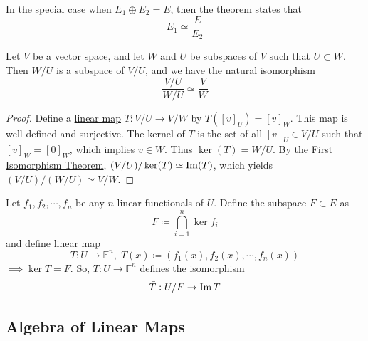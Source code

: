   \begin{corollary}
    \label{thm:rank-nullity-for-a-direct-sum}
    In the special case when $E_1 \oplus E_2 = E$, then the theorem states that 
    \begin{equation}
      E_1 \simeq \frac{E}{E_2}
    \end{equation}
  \end{corollary}

  \begin{theorem}
    \label{thm:third-isomorphism-theorem}
    Let $V$ be a \hyperref[def:vector-space]{vector space}, and let $W$ and $U$ be subspaces of $V$ such that $U \subset W$. Then $W/U$ is a subspace of $V/U$, and we have the \hyperref[cat-def:natural-isomorphism]{natural isomorphism}
    \begin{equation}
      \frac{V / U}{W / U} \simeq \frac{V}{W}
    \end{equation}
  \end{theorem}
  \begin{proof}
    Define a \hyperref[def:linear_map]{linear map} $T: V/U \to V/W$ by $T([v]_U) = [v]_W$. This map is well-defined and surjective. The kernel of $T$ is the set of all $[v]_U \in V/U$ such that $[v]_W = [0]_W$, which implies $v \in W$. Thus $\ker(T) = W/U$. By the \hyperref[thm:first-isomorphism-theorem]{First Isomorphism Theorem}, $(V/U) / \ker(T) \simeq \operatorname{Im}(T)$, which yields $(V/U)/(W/U) \simeq V/W$.
  \end{proof}

  Let $f_1, f_2, \cdots, f_n$ be any $n$ linear functionals of $U$. Define the subspace $F \subset E$ as 
  \begin{equation}
    F \coloneqq \bigcap_{i=1}^n \ker{f_i}
  \end{equation}
  and define \hyperref[def:linear_map]{linear map} 
  \begin{equation}
    T: U \to \mathbb{F}^n, \; T(x) \coloneqq (f_1(x), f_2(x), \cdots, f_n(x))
  \end{equation}
  $\implies \ker{T} = F$. So, $T: U \to \mathbb{F}^n$ defines the isomorphism 
  \begin{equation}
    \bar{T}: U / F \to \operatorname{Im}{T}
  \end{equation}

\subsection{Algebra of Linear Maps}

